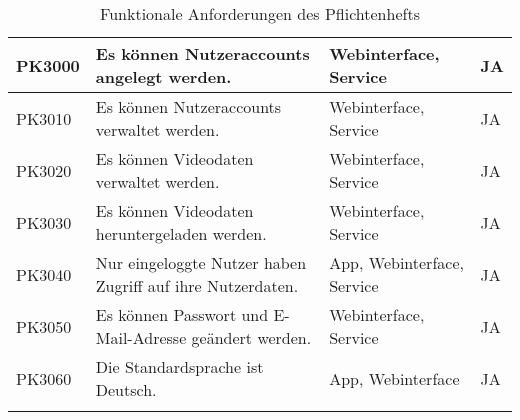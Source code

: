 \begin{longtable}{p{} | p{} | p{} | p{}}
  \hline 
  PK3000 & Es können Nutzeraccounts angelegt werden. & Webinterface, Service & JA
   \\
  \hline 
  PK3010 & Es können Nutzeraccounts verwaltet werden. & Webinterface, Service & JA
   \\
  \hline 
  PK3020 & Es können Videodaten verwaltet werden. & Webinterface, Service & JA
   \\
  \hline 
  PK3030 & Es können Videodaten heruntergeladen werden. & Webinterface, Service & JA
   \\
  \hline 
  PK3040 & Nur eingeloggte Nutzer haben Zugriff auf ihre Nutzerdaten. & App, Webinterface, Service & JA
   \\
  \hline 
  PK3050 & Es können Passwort und E-Mail-Adresse geändert werden. & Webinterface, Service & JA
   \\
  \hline 
  PK3060 & Die Standardsprache ist Deutsch. & App, Webinterface & JA
  \\
  \hline
  \caption{Funktionale Anforderungen des Pflichtenhefts}
 \end{longtable}
